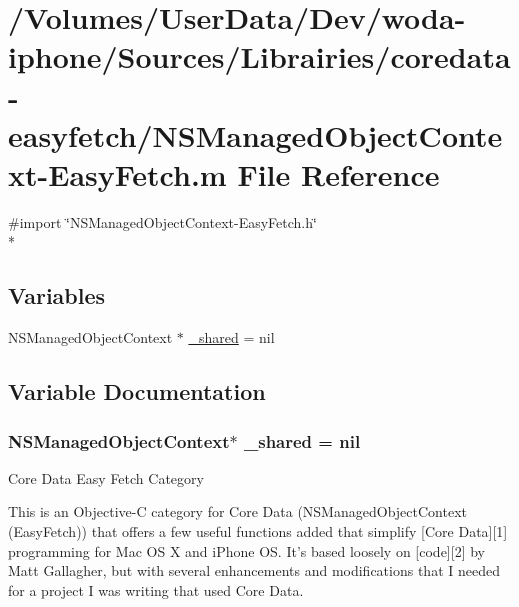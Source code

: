 \hypertarget{_n_s_managed_object_context-_easy_fetch_8m}{\section{/\-Volumes/\-User\-Data/\-Dev/woda-\/iphone/\-Sources/\-Librairies/coredata-\/easyfetch/\-N\-S\-Managed\-Object\-Context-\/\-Easy\-Fetch.m File Reference}
\label{_n_s_managed_object_context-_easy_fetch_8m}
}
{\ttfamily \#import \char`\"{}N\-S\-Managed\-Object\-Context-\/\-Easy\-Fetch.\-h\char`\"{}}\\*
\subsection*{Variables}
\begin{DoxyCompactItemize}
\item 
N\-S\-Managed\-Object\-Context $\ast$ \hyperlink{_n_s_managed_object_context-_easy_fetch_8m_a7d6bb52f50b87b856aa87b84d7c525a0}{\-\_\-shared} = nil
\end{DoxyCompactItemize}


\subsection{Variable Documentation}
\hypertarget{_n_s_managed_object_context-_easy_fetch_8m_a7d6bb52f50b87b856aa87b84d7c525a0}{
\subsubsection[{\-\_\-shared}]{\setlength{\rightskip}{0pt plus 5cm}N\-S\-Managed\-Object\-Context$\ast$ \-\_\-shared = nil}}\label{_n_s_managed_object_context-_easy_fetch_8m_a7d6bb52f50b87b856aa87b84d7c525a0}
Core Data Easy Fetch Category

This is an Objective-\/\-C category for Core Data ({\ttfamily N\-S\-Managed\-Object\-Context (Easy\-Fetch)}) that offers a few useful functions added that simplify \mbox{[}Core Data\mbox{]}\mbox{[}1\mbox{]} programming for Mac O\-S X and i\-Phone O\-S. It's based loosely on \mbox{[}code\mbox{]}\mbox{[}2\mbox{]} by Matt Gallagher, but with several enhancements and modifications that I needed for a project I was writing that used Core Data.

